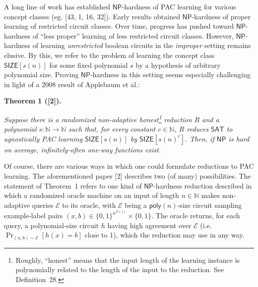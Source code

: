 A long line of work has established ${\mathsf{NP}}$-hardness of PAC learning for various concept classes (eg. [43, 1, 16, 32]). Early results obtained ${\mathsf{NP}}$-hardness of proper learning of restricted circuit classes. Over time, progress has pushed toward ${\mathsf{NP}}$-hardness of “less proper” learning of less restricted circuit classes. However, ${\mathsf{NP}}$-hardness of learning \emph{unrestricted} boolean circuits in the \emph{improper} setting remains elusive. By this, we refer to the problem of learning the concept class ${\mathsf{SIZE}}[s(n)]$ for some fixed polynomial $s$ by a hypothesis of arbitrary polynomial size. Proving ${\mathsf{NP}}$-hardness in this setting seems especially challenging in light of a 2008 result of Applebaum et al.:\par





\par\medskip\noindent\textbf{
\textbf{Theorem 1}\textbf{ }([2])\textbf{.}
}\par



\emph{Suppose there is a randomized non-adaptive honest\footnote{Roughly, “honest” means that the input length of the learning instance is polynomially related to the length of the input to the reduction. See Definition 28.} reduction $R$ and a polynomial $s:\mathbb{N}\to\mathbb{N}$ such that, for every constant $c\in\mathbb{N}$, $R$ reduces ${\mathsf{SAT}}$ to agnostically PAC learning ${\mathsf{SIZE}}[s(n)]$ by ${\mathsf{SIZE}}[s(n)^{c}]$. Then, if ${\mathsf{NP}}$ is hard on average, infinitely-often one-way functions exist.}\par






Of course, there are various ways in which one could formulate reductions to PAC learning. The aforementioned paper [2] describes two (of many) possibilities. The statement of Theorem 1 refers to one kind of ${\mathsf{NP}}$-hardness reduction described in which a randomized oracle machine on an input of length $n\in\mathbb{N}$ makes non-adaptive queries $\mathcal{E}$ to its oracle, with $\mathcal{E}$ being a ${\mathsf{poly}}(n)$-size circuit sampling example-label pairs $(x,b)\in\{0,1\}^{n^{\Omega(1)}}\times\{0,1\}$. The oracle returns, for each query, a polynomial-size circuit $h$ having high agreement over $\mathcal{E}$ (i.e. $\Pr_{(x,b)\sim\mathcal{E}}[h(x)=b]$ close to 1), which the reduction may use in any way.\par





